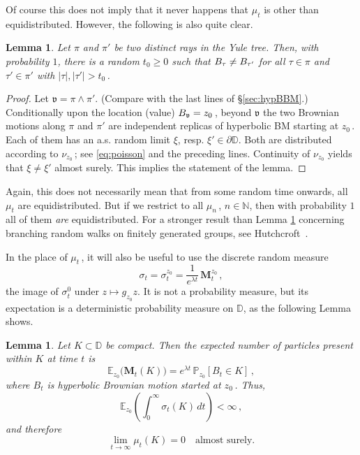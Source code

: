 \documentclass[12pt]{amsart}
\newcommand\BB{\textit{\textbf{B}}}
\newcommand\E{\mathbb E}
\newcommand\DD{\mathbb D}
\newcommand\gm{g}
\newcommand\Laa{\sigma}
\newcommand\Mbf{\mathbf M}
\newcommand\N{\mathbb N}
\newcommand\Prob{\mathbb P}
\newcommand\vt{\mathfrak{v}}
\numberwithin{theorem}{section}
\newtheorem{lem}[theorem]{Lemma}%
\theoremstyle{definition}
\begin{document}
Of course this does not imply that it never happens that $\mu_t$ is other than equidistributed.
However, the following is also quite clear.

\begin{lem}\label{lem:rays} Let $\pi$ and $\pi'$ be two distinct rays in the Yule tree. 
Then, with probability $1$, there is a random $t_0 \ge 0$ such that $\BB_{\tau} \ne \BB_{\tau'}$
for all $\tau \in\pi$ and $\tau' \in \pi'$ with $|\tau|, |\tau'| > t_0\,$.  
\end{lem}

\begin{proof}
Let $\vt = \pi \wedge \pi'$. (Compare with the last lines of \S \ref{sec:hypBBM}.) Conditionally
upon the location (value) $\BB_{\vt} = z_0\,$, beyond $\vt$ the two Brownian motions along $\pi$ and $\pi'$
are independent replicas of hyperbolic BM starting at $z_0\,$. Each of them has an a.s. random 
limit $\xi$, resp. $\xi' \in \partial \DD$. Both are distributed according to $\nu_{z_0}\,$; 
see \eqref{eq:poisson} and the preceding lines. Continuity of $\nu_{z_0}$ yields that $\xi \ne \xi'$
almost surely. This implies the statement of the lemma.
\end{proof}

Again, this does not necessarily mean that from some random time onwards, all $\mu_t$ are 
equidistributed. But if we restrict to all $\mu_n\,$, $n \in \N$, then with probability $1$
all of them \emph{are} equidistributed.
For a stronger result than Lemma \ref{lem:rays} concerning branching 
random walks on finitely generated groups,
see {\sc Hutchcroft}~\cite{Hu}. 

\smallskip

In the place of $\mu_t\,$, it will also be useful to use the
discrete random measure 
$$
\Laa_t = \Laa^{z_0}_t = \frac{1}{e^{\lambda t}}\, \Mbf^{z_0}_t\,,
$$
the image of $\Laa^0_t$ under $z \mapsto \gm_{z_0}z$. 
It is not a probability measure, but its expectation  is a deterministic probability 
measure on $\DD$, as the following Lemma shows.

\begin{lem}\label{lem:compact} Let $K \subset \DD$ be compact.
Then the expected number of particles present within $K$ at time $t$ is 
$$
\E_{z_0}\bigl( \Mbf_t(K) \bigr) = e^{\lambda t} \,\Prob_{z_0}[B_t \in K]\,,
$$
where $B_t$ is hyperbolic Brownian motion started at $z_0\,$. Thus,
$$
\E_{z_0}\left( \int_0^{\infty}  \Laa_t(K)\,dt \right) < \infty\,,
$$
and therefore 
$$
\lim_{t \to \infty} \mu_t(K) = 0 \quad \text{almost surely.}
$$
\end{lem}
\end{document}
